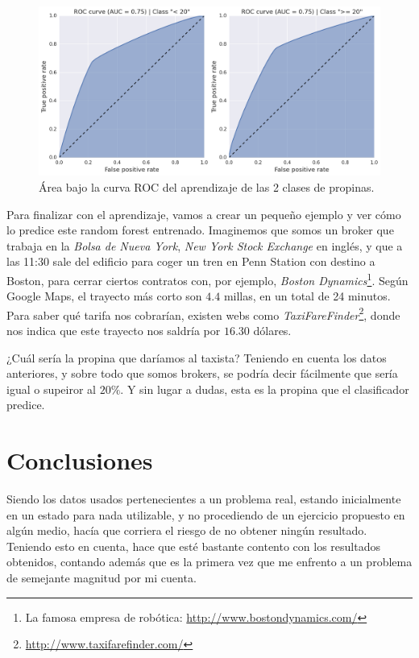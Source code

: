 \begin{figure}[H]
  \centering
  \includegraphics[width=136mm]{figures/ch_05/roc_auc.png}
  \caption{Área bajo la curva ROC del aprendizaje de las 2 clases de propinas.}
  \label{fig:5.18}
\end{figure}

Para finalizar con el aprendizaje, vamos a crear un pequeño ejemplo y ver cómo lo predice este random forest entrenado. Imaginemos que somos un broker que trabaja en la \emph{Bolsa de Nueva York}, \emph{New York Stock Exchange} en inglés, y que a las 11:30 sale del edificio para coger un tren en Penn Station con destino a Boston, para cerrar ciertos contratos con, por ejemplo, \emph{Boston Dynamics}\footnote{La famosa empresa de robótica: \url{http://www.bostondynamics.com/}}. Según Google Maps, el trayecto más corto son $4.4$ millas, en un total de 24 minutos. Para saber qué tarifa nos cobrarían, existen webs como \emph{TaxiFareFinder}\footnote{\url{http://www.taxifarefinder.com/}}, donde nos indica que este trayecto nos saldría por $16.30$ dólares.

¿Cuál sería la propina que daríamos al taxista? Teniendo en cuenta los datos anteriores, y sobre todo que somos brokers, se podría decir fácilmente que sería igual o supeiror al $20\%$. Y sin lugar a dudas, esta es la propina que el clasificador predice.

\section{Conclusiones} \label{sec:5.4}

Siendo los datos usados pertenecientes a un problema real, estando inicialmente en un estado para nada utilizable, y no procediendo de un ejercicio propuesto en algún medio, hacía que corriera el riesgo de no obtener ningún resultado. Teniendo esto en cuenta, hace que esté bastante contento con los resultados obtenidos, contando además que es la primera vez que me enfrento a un problema de semejante magnitud por mi cuenta.

